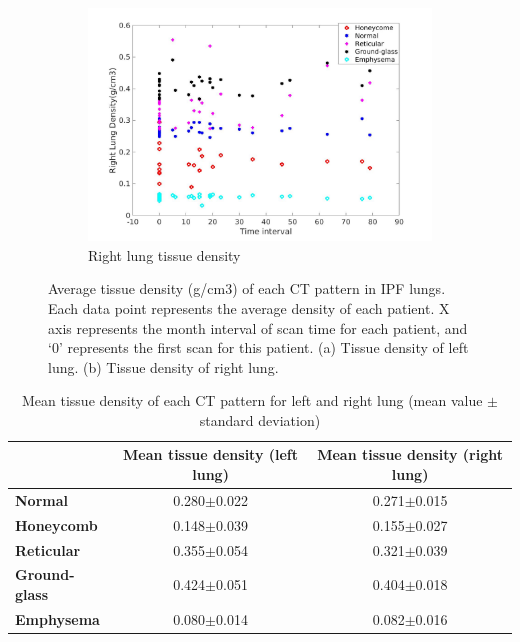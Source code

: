 \begin{figure}[htbp]
\begin{subfigure}{.57\linewidth}
  \includegraphics[width=\linewidth,trim={{.0\wd0} {.0\wd0} {.0\wd0} {.0\wd0}},clip]{QuantitativeAnalysis/Image/RightLungDensity.jpg}
  \caption{Right lung tissue density}
  \label{fig:LungDensity-b} 
\end{subfigure}
\caption{Average tissue density (g/cm3) of each CT pattern in IPF lungs. Each data point represents the average density of each patient. X axis represents the month interval of scan time for each patient, and ‘0’ represents the first scan for this patient. (a) Tissue density of left lung. (b) Tissue density of right lung.}
\label{fig:LungDensity}
\end{figure}

\begin{table}[htbp]
\centering
\caption{Mean tissue density of each CT pattern for left and right lung (mean value $\pm$ standard deviation)}
\label{tab:MeanDensity}
\begin{tabular}{|l | c | c|}
\hline
& \bf{Mean tissue density (left lung)} & \bf{Mean tissue density (right lung)} \\ 
\hline
\bf{Normal} & 0.280$\pm$0.022 & 0.271$\pm$0.015 \\
\hline
\bf{Honeycomb} & 0.148$\pm$0.039 & 0.155$\pm$0.027 \\
\hline
\bf{Reticular} & 0.355$\pm$0.054 & 0.321$\pm$0.039 \\
\hline
\bf{Ground-glass} & 0.424$\pm$0.051 & 0.404$\pm$0.018 \\
\hline
\bf{Emphysema} & 0.080$\pm$0.014 & 0.082$\pm$0.016 \\
\hline
\end{tabular}
\end{table}


